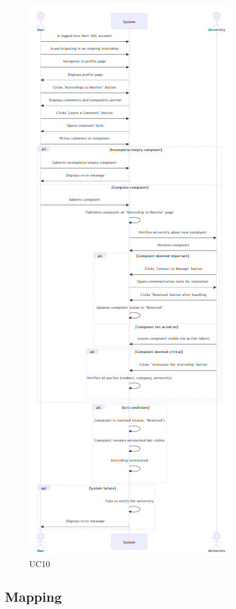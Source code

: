 \begin{figure}[H]
    \centering
    \includegraphics[width=0.5\linewidth]{RASD//Images/UC10.png}
    \caption{UC10}
\end{figure}

\pagebreak
\subsection{Mapping}

